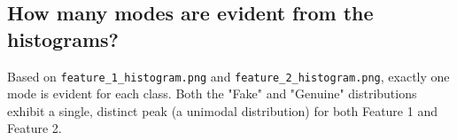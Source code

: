 \subsection*{How many modes are evident from the histograms?}
Based on \texttt{feature\_1\_histogram.png} and \texttt{feature\_2\_histogram.png}, exactly one mode is evident for each class. Both the "Fake" and "Genuine" distributions exhibit a single, distinct peak (a unimodal distribution) for both Feature 1 and Feature 2.